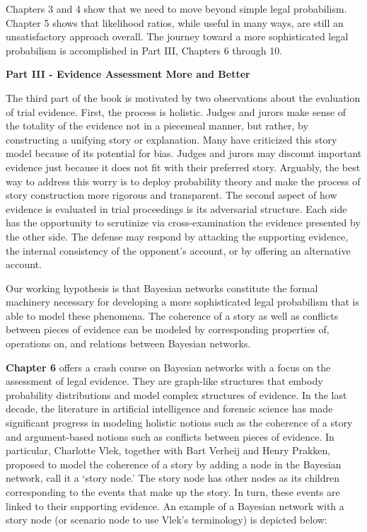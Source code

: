 \documentclass[
  10pt,
  dvipsnames,enabledeprecatedfontcommands]{scrartcl}
\begin{document}
Chapters 3 and 4 show that we need to move beyond simple legal
probabilism. Chapter 5 shows that likelihood ratios, while useful in
many ways, are still an unsatisfactory approach overall. The journey
toward a more sophisticated legal probabilism is accomplished in Part
III, Chapters 6 through 10.

\vspace{3mm}

\noindent \textbf{Part III - Evidence Assessment More and Better}

\noindent The third part of the book is motivated by two observations
about the evaluation of trial evidence. First, the process is holistic.
Judges and jurors make sense of the totality of the evidence not in a
piecemeal manner, but rather, by constructing a unifying story or
explanation. Many have criticized this story model because of its
potential for bias. Judges and jurors may discount important evidence
just because it does not fit with their preferred story. Arguably, the
best way to address this worry is to deploy probability theory and make
the process of story construction more rigorous and transparent. The
second aspect of how evidence is evaluated in trial proceedings is its
adversarial structure. Each side has the opportunity to scrutinize via
cross-examination the evidence presented by the other side. The defense
may respond by attacking the supporting evidence, the internal
consistency of the opponent's account, or by offering an alternative
account.

Our working hypothesis is that Bayesian networks constitute the formal
machinery necessary for developing a more sophisticated legal
probabilism that is able to model these phenomena. The coherence of a
story as well as conflicts between pieces of evidence can be modeled by
corresponding properties of, operations on, and relations between
Bayesian networks.

\textbf{Chapter 6} offers a crash course on Bayesian networks with a
focus on the assessment of legal evidence. They are graph-like
structures that embody probability distributions and model complex
structures of evidence. In the last decade, the literature in artificial
intelligence and forensic science has made significant progress in
modeling holistic notions such as the coherence of a story and
argument-based notions such as conflicts between pieces of evidence. In
particular, Charlotte Vlek, together with Bart Verheij and Henry
Prakken, proposed to model the coherence of a story by adding a node in
the Bayesian network, call it a `story node.' The story node has other
nodes as its children corresponding to the events that make up the
story. In turn, these events are linked to their supporting evidence. An
example of a Bayesian network with a story node (or scenario node to use
Vlek's terminology) is depicted below:
\end{document}
